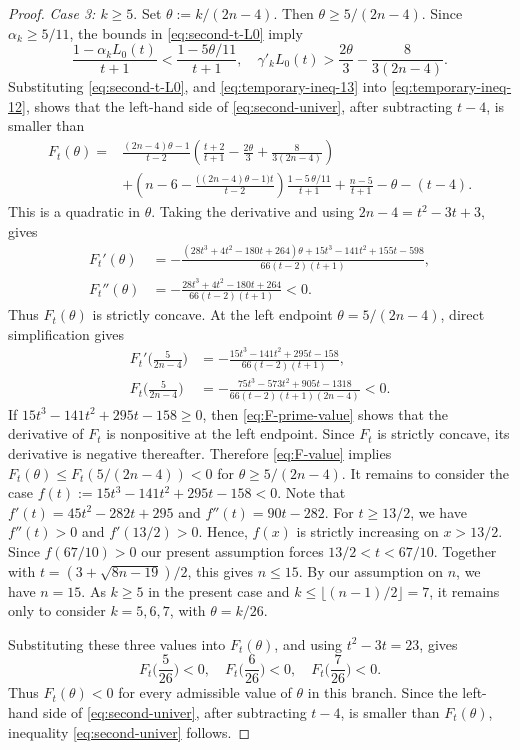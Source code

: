 \documentclass[11pt]{article}
\theoremstyle{plain}
\theoremstyle{definition}
\numberwithin{equation}{section}
\begin{document}
\begin{proof}
\noindent\emph{Case 3: $k\geq 5$}. Set $\theta:= k/(2n-4)$.
Then $\theta\ge5/(2n-4)$. Since $\alpha_k\geq 5/11$, the bounds in \eqref{eq:second-t-L0} imply
\begin{equation}\label{eq:temporary-ineq-13}
\frac{1-\alpha_kL_0(t)}{t+1} < \frac{1-5\theta/11}{t+1}, \quad
\gamma'_kL_0(t) > \frac{2\theta}{3}-\frac{8}{3(2n-4)}.
\end{equation}
Substituting \eqref{eq:second-t-L0}, and \eqref{eq:temporary-ineq-13} into \eqref{eq:temporary-ineq-12}, 
shows that the left-hand side of \eqref{eq:second-univer}, after subtracting $t-4$, is smaller than
\begin{align*}
F_t(\theta) = {} 
& \frac{(2n-4)\theta-1}{t-2} \left(\frac{t+2}{t+1}-\frac{2\theta}{3} + \frac{8}{3(2n-4)}\right) \\
& + \left(n - 6 - \frac{\big((2n - 4)\theta - 1\big) t}{t-2}\right) \frac{1-5\,\theta/11}{t+1} + \frac{n-5}{t+1} - \theta - (t - 4).
\end{align*}
This is a quadratic in $\theta$. Taking the derivative and using
$2n-4=t^2-3t+3$, gives
\begin{align*}
F_t'(\theta) 
& = -\frac{(28t^3 + 4t^2 - 180t + 264) \theta
+ 15t^3 - 141t^2 + 155t - 598}{66(t-2)(t+1)}, \\
F_t''(\theta)
& = -\frac{28t^3+4t^2-180t+264}{66(t-2)(t+1)}<0. 
\end{align*}
Thus $F_t(\theta)$ is strictly concave. At the left endpoint
$\theta=5/(2n-4)$, direct simplification gives
\begin{align}
F_t' \Big(\frac{5}{2n - 4}\Big)
& = -\frac{15t^3 - 141t^2 + 295t - 158}{66(t-2)(t+1)}, \label{eq:F-prime-value} \\
F_t\Big(\frac{5}{2n-4}\Big)
& = -\frac{75t^3 - 573t^2 + 905t - 1318}{66(t - 2)(t + 1)(2n - 4)} < 0. \label{eq:F-value}
\end{align}
If $15t^3 - 141t^2 + 295t - 158\geq 0$,
then \eqref{eq:F-prime-value} shows that the derivative of $F_t$ is nonpositive at the
left endpoint. Since $F_t$ is strictly concave, its derivative is negative thereafter. 
Therefore \eqref{eq:F-value} implies
$F_t(\theta)\leq F_t (5/(2n-4)) < 0$ for $\theta\geq 5/(2n-4)$.
It remains to consider the case
$f(t):= 15t^3 - 141t^2 + 295t - 158 < 0$.
Note that $f'(t) = 45t^2 - 282t + 295$ and $f''(t) = 90t - 282$.
For $t\geq 13/2$, we have $f''(t) > 0$ and $f'(13/2) > 0$.
Hence, $f(x)$ is strictly increasing on $x > 13/2$. Since
$f(67/10) > 0$ our present assumption forces $13/2 < t < 67/10$. Together with
$t = (3+\sqrt{8n-19})/2$, this gives $n\leq 15$. By our assumption on $n$, we have $n=15$. 
As $k\geq 5$ in the present case and
$k\leq\lfloor (n-1)/2\rfloor = 7$, it remains only to consider \(k=5,6,7\), with
\(\theta=k/26\).

Substituting these three values into $F_t(\theta)$, and using $t^2 - 3t = 23$, gives
\[
F_t\Big(\frac{5}{26}\Big) < 0, \quad
F_t\Big(\frac{6}{26}\Big) < 0, \quad
F_t\Big(\frac{7}{26}\Big) < 0.
\]
Thus $F_t(\theta)<0$ for every admissible value of $\theta$ in this branch. Since the 
left-hand side of \eqref{eq:second-univer}, after subtracting $t-4$, is smaller than $F_t(\theta)$, 
inequality \eqref{eq:second-univer} follows.
\end{proof}
\end{document}
